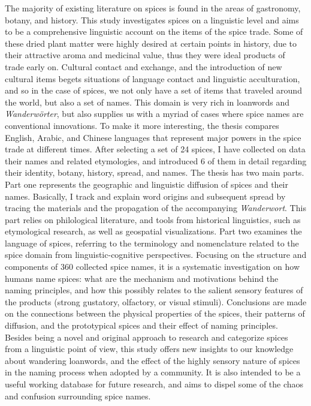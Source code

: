 The majority of existing literature on spices is found in the areas of gastronomy, botany, and history. This study investigates spices on a linguistic level and aims to be a comprehensive linguistic account on the items of the spice trade. Some of these dried plant matter were highly desired at certain points in history, due to their attractive aroma and medicinal value, thus they were ideal products of trade early on. Cultural contact and exchange, and the introduction of new cultural items begets situations of language contact and linguistic acculturation, and so in the case of spices, we not only have a set of items that traveled around the world, but also a set of names. This domain is very rich in loanwords and \textit{Wanderwörter}, but also supplies us with a myriad of cases where spice names are conventional innovations. To make it more interesting, the thesis compares English, Arabic, and Chinese languages that represent major powers in the spice trade at different times. After selecting a set of 24 spices, I have collected on data their names and related etymologies, and introduced 6 of them in detail regarding their identity, botany, history, spread, and names. The thesis has two main parts. Part one represents the geographic and linguistic diffusion of spices and their names. Basically, I track and explain word origins and subsequent spread by tracing the materials and the propagation of the accompanying \textit{Wanderwort}. This part relies on philological literature, and tools from historical linguistics, such as etymological research, as well as geospatial visualizations. Part two examines the language of spices, referring to the terminology and nomenclature related to the spice domain from linguistic-cognitive perspectives. Focusing on the structure and components of 360 collected spice names, it is a systematic investigation on how humans name spices: what are the mechanism and motivations behind the naming principles, and how this possibly relates to the salient sensory features of the products (strong gustatory, olfactory, or visual stimuli). Conclusions are made on the connections between the physical properties of the spices, their patterns of diffusion, and the prototypical spices and their effect of naming principles. Besides being a novel and original approach to research and categorize spices from a linguistic point of view, this study offers new insights to our knowledge about wandering loanwords, and the effect of the highly sensory nature of spices in the naming process when adopted by a community. It is also intended to be a useful working database for future research, and aims to dispel some of the chaos and confusion surrounding spice names.

\relax
{}\relax